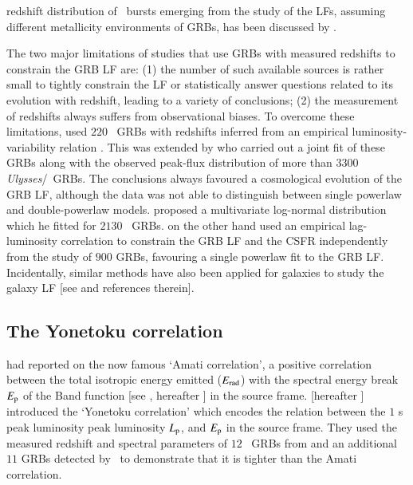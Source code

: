 redshift distribution of \s\ bursts emerging from the study of the LFs, assuming different metallicity environments of GRBs, has been discussed by \cite{Natarajan_et_al.-2005-MNRAS}.

The two major limitations of studies that use GRBs with measured redshifts to constrain the GRB LF are: (1) the number of such available sources is rather small to tightly constrain the LF or statistically answer questions related to its evolution with redshift, leading to a variety of conclusions; (2) the measurement of redshifts always suffers from observational biases. To overcome these limitations, \cite{Lloyd-Ronning_et_al.-2002-ApJ} used $220$ \B\ GRBs with redshifts inferred from an empirical luminosity-variability relation \citep{Fenimore_and_Ramirez-Ruiz-2000-arXiv}. This was extended by \cite{Firmani_et_al.-2004-ApJ} who carried out a joint fit of these GRBs along with the observed peak-flux distribution of more than $3300$ \emph{Ulysses}/\B\ GRBs. The conclusions always favoured a cosmological evolution of the GRB LF, although the data was not able to distinguish between single powerlaw and double-powerlaw models. \cite{Shahmoradi-2013-ApJ} proposed a multivariate log-normal distribution which he fitted for $2130$ \B\ GRBs. \cite{Kocevski_&_Liang-2006-ApJ} on the other hand used an empirical lag-luminosity correlation to constrain the GRB LF and the CSFR independently from the study of $900$ GRBs, favouring a single powerlaw fit to the GRB LF. Incidentally, similar methods have also been applied for galaxies to study the galaxy LF [see \cite{Galaxy_LF_pseudo_redshift-2017-arXiv} and references therein].

\subsection{The Yonetoku correlation}
\label{subsec:introducing_the_Yonetoku_correlation}
\cite{Amati_et_al.-2002-A&A} had reported on the now famous `Amati correlation', a positive correlation between the total isotropic energy emitted ($E_{\rm rad}$) with the spectral energy break $E_{\rm p}$ of the Band function [see \cite{Band_et_al.-1993-ApJ}, hereafter ] in the source frame. \cite{Yonetoku_et_al.-2004-ApJ} [hereafter ] introduced the `Yonetoku correlation' which encodes the relation between the $1$ s peak luminosity peak luminosity $L_{\rm p}$, and $E_{\rm p}$ in the source frame. They used the measured redshift and spectral parameters of $12$ \bs\ GRBs from \cite{Amati_et_al.-2002-A&A} and an additional $11$ GRBs detected by \B\ to demonstrate that it is tighter than the Amati correlation.

